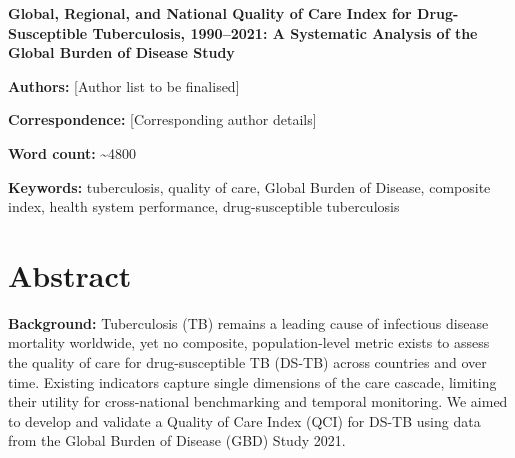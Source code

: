 \documentclass[12pt]{article}
\begin{document}

\begin{titlepage}
\centering
\vspace*{2cm}

{\LARGE\bfseries Global, Regional, and National Quality of Care Index for Drug-Susceptible Tuberculosis, 1990--2021: A Systematic Analysis of the Global Burden of Disease Study\par}

\vspace{2cm}

{\large\textbf{Authors:} [Author list to be finalised]\par}

\vspace{1cm}

{\large\textbf{Correspondence:} [Corresponding author details]\par}

\vspace{1cm}

{\large\textbf{Word count:} \textasciitilde 4800\par}

\vspace{1cm}

{\large\textbf{Keywords:} tuberculosis, quality of care, Global Burden of Disease, composite index, health system performance, drug-susceptible tuberculosis\par}

\vfill

\end{titlepage}


\section*{Abstract}

\textbf{Background:} Tuberculosis (TB) remains a leading cause of infectious disease mortality worldwide, yet no composite, population-level metric exists to assess the quality of care for drug-susceptible TB (DS-TB) across countries and over time. Existing indicators capture single dimensions of the care cascade, limiting their utility for cross-national benchmarking and temporal monitoring. We aimed to develop and validate a Quality of Care Index (QCI) for DS-TB using data from the Global Burden of Disease (GBD) Study 2021.
\end{document}
